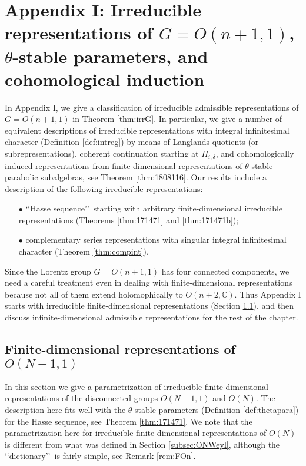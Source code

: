 \newpage
\section{Appendix I: Irreducible representations of $G=O(n+1,1)$, 
$\theta$-stable parameters,  and cohomological induction}
\label{sec:aq}
In Appendix I,
 we give a classification
 of irreducible admissible representations
 of $G=O(n+1,1)$
 in Theorem \ref{thm:irrG}.  
In particular, 
 we give a number of equivalent descriptions
 of irreducible representations
 with integral infinitesimal character
 (Definition \ref{def:intreg})
 by means of Langlands quotients
 (or subrepresentations), 
 coherent continuation starting at
 $\Pi_{i,\delta}$, 
 and cohomologically induced representations from 
 finite-dimensional representations of $\theta$-stable parabolic subalgebras,
 see Theorem \ref{thm:1808116}.  
Our results include a description
 of the following irreducible representations:
\begin{enumerate}
\item[$\bullet$]
\lq\lq{Hasse sequence}\rq\rq\ starting with arbitrary finite-dimensional 
irreducible representations
 (Theorems \ref{thm:171471} and \ref{thm:171471b});
\item[$\bullet$]
complementary series representations
 with
 singular integral infinitesimal character
 (Theorem \ref{thm:compint}).  
\end{enumerate}
Since the Lorentz group $G=O(n+1,1)$ has four connected components, 
 we need a careful treatment
 even in dealing with finite-dimensional representations
 because not all of them extend holomophically 
 to $O(n+2,{\mathbb{C}})$.  
Thus Appendix I starts with irreducible finite-dimensional representations
 (Section \ref{subsec:fdimrep}), 
 and then discuss infinite-dimensional admissible representations
 for the rest of the chapter.  


\subsection{Finite-dimensional representations of $O(N-1,1)$}
\label{subsec:fdimrep}
In this section we give a parametrization
 of irreducible finite-dimensional representations
 of the disconnected groups $O(N-1,1)$ and $O(N)$.   
The description here fits well with the $\theta$-stable parameters
 (Definition \ref{def:thetapara})
 for the Hasse sequence, 
 see Theorem \ref{thm:171471}.  
We note
 that the parametrization here 
 for irreducible finite-dimensional representations
 of $O(N)$ is different from what was defined in Section \ref{subsec:ONWeyl},  
 although the \lq\lq{dictionary}\rq\rq\
 is fairly simple,
 see Remark \ref{rem:FOn}.  



